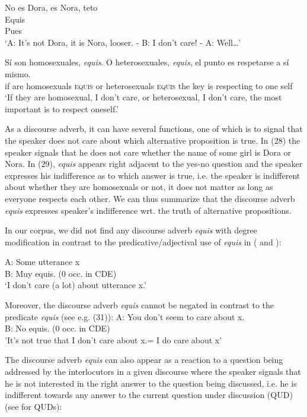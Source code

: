 \documentclass[output=paper
,modfonts
,nonflat]{langsci/langscibook}
\begin{document}
\ea
\begin{xlist}
 No es Dora, es Nora, teto\\
 Equis\\
 Pues\\
\glt ‘A: It’s not Dora, it is Nora, looser. - B: I don’t care! - A: Well…’
\end{xlist}
\z

\ea
\gll Sí son homosexuales, \textit{equis}. O heterosexuales, \textit{equis}, el punto es respetarse a sí mismo.\\
if are homosexuals \textsc{equis} or heterosexuals \textsc{equis} the key is respecting to one self\\
\glt ‘If they are homosexual, I don’t care, or heterosexual, I don’t care, the most important is to respect oneself.’
\z

As a discourse adverb, it can have several functions, one of which is to signal that the speaker does not care about which alternative proposition is true. In (28) the speaker signals that he does not care whether the name of some girl is Dora or Nora. In (29), \textit{equis} appears right adjacent to the yes-no question and the speaker expresses his indifference as to which answer is true, i.e. the speaker is indifferent about whether they are homosexuals or not, it does not matter as long as everyone respects each other. We can thus summarize that the discourse adverb \textit{equis} expresses speaker’s indifference wrt. the truth of alternative propositions. 

In our corpus, we did not find any discourse adverb \textit{equis} with degree modification in contrast to the predicative/adjectival use of \textit{equis} in ( and ):

\ea
\gll A: Some utterance x \\
B: Muy equis. (0 occ. in CDE)\\
\glt ‘I don’t care (a lot) about utterance x.’
\z

Moreover, the discourse adverb \textit{equis} cannot be negated in contrast to the predicate \textit{equis} (see e.g. (31)):
\ea
\gll A: You don't seem to care about x. \\
B: No equis. (0 occ. in CDE)\\
\glt 'It's not true that I don't care about x.= I do care about x'
\z 

The discourse adverb \textit{equis} can also appear as a reaction to a question being addressed by the interlocutors in a given discourse where the speaker signals that he is not interested in the right answer to the question being discussed, i.e. he is indifferent towards any answer to the current question under discussion (QUD) (see \citealt{Roberts1996} for QUDs):
\end{document}

